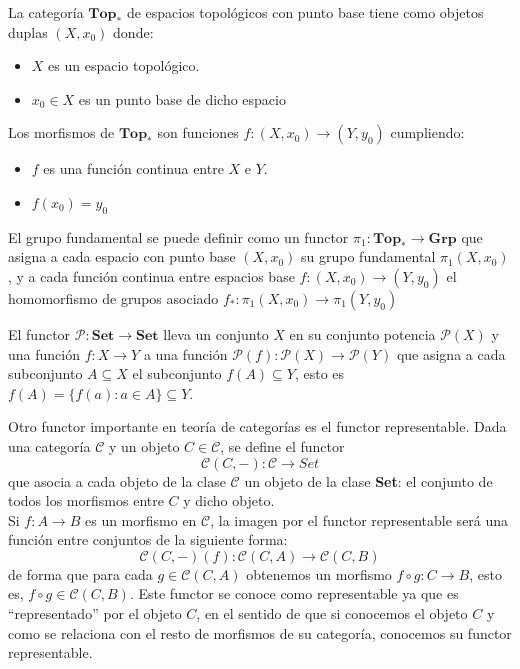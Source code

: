 \begin{ejemplo}
     La categoría $\textbf{Top}_{*}$ de espacios topológicos con punto base tiene como objetos duplas $(X,x_{0})$ donde:
    \begin{itemize}
        \item $X$ es un espacio topológico.
        \item $x_{0} \in X$ es un punto base de dicho espacio 
    \end{itemize}
    Los morfismos de $\textbf{Top}_{*}$ son funciones $f: (X,x_{0}) \longrightarrow (Y,y_{0})$ cumpliendo:
    \begin{itemize}
        \item $f$ es una función continua entre $X$ e $Y$.
        \item $f(x_{0}) = y_{0}$ 
    \end{itemize}
    El grupo fundamental se puede definir como un functor $\pi_{1}: \textbf{Top}_{*} \longrightarrow \textbf{Grp} $ que asigna a cada espacio con punto base $(X,x_{0})$ su grupo fundamental $\pi_{1}(X,x_{0})$, y a cada función continua entre espacios base $f: (X,x_{0}) \longrightarrow (Y,y_{0})$ el homomorfismo de grupos asociado $f_{*}: \pi_{1}(X,x_{0}) \longrightarrow \pi_{1}(Y,y_{0})$
\end{ejemplo}

\begin{ejemplo}
    El functor $\mathcal{P}: \textbf{Set} \longrightarrow \textbf{Set}$ lleva un conjunto $X$ en su conjunto potencia $\mathcal{P}(X)$ y una función $f: X \longrightarrow Y$ a una función $\mathcal{P}(f): \mathcal{P}(X) \longrightarrow \mathcal{P}(Y)$ que asigna a cada subconjunto $A \subseteq X$ el subconjunto $f(A) \subseteq Y$, esto es $f(A) = \{f(a) : a \in A\} \subseteq Y$.
    \label{ejemplo:potencia}
\end{ejemplo}

\begin{ejemplo}
    Otro functor importante en teoría de categorías es el functor representable. Dada una categoría $\mathscr{C}$ y un objeto $C \in \mathscr{C}$, se define el functor \begin{equation}
        \mathscr{C}(C,-): \mathscr{C} \longrightarrow Set
    \end{equation} que asocia a cada objeto de la clase $\mathscr{C}$ un objeto de la clase \textbf{Set}: el conjunto de todos los morfismos entre $C$ y dicho objeto. \\
    Si $f: A \longrightarrow B$ es un morfismo en $\mathscr{C}$, la imagen por el functor representable será una función entre conjuntos de la siguiente forma: \begin{equation}
        \mathscr{C}(C,-)(f): \mathscr{C}(C,A) \longrightarrow \mathscr{C}(C,B)
    \end{equation} de forma que para cada $g \in \mathscr{C}(C,A)$ obtenemos un morfismo $f \circ g: C \longrightarrow B$, esto es, $f \circ g \in \mathscr{C}(C,B).$
    Este functor se conoce como representable ya que es ``representado'' por el objeto $C$, en el sentido de que si conocemos el objeto $C$ y como se relaciona con el resto de morfismos de su categoría, conocemos su functor representable. 
    \label{ej:func_repre}
\end{ejemplo}

